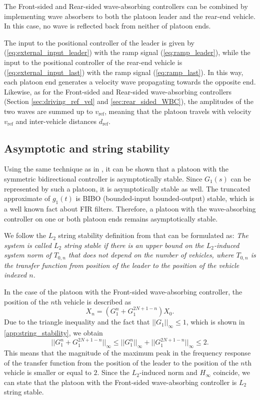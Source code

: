 \documentclass[final,5p,times,twocolumn]{elsarticle}
\begin{document}
The Front-sided and Rear-sided wave-absorbing controllers can be combined by implementing wave absorbers to both the platoon leader and the rear-end vehicle. In this case, no wave is reflected back from neither of platoon ends.

The input to the positional controller of the leader is given by (\ref{eq:external_input_leader}) with the ramp signal (\ref{eq:ramp_leader}), while the input to the positional controller of the rear-end vehicle is (\ref{eq:external_input_last}) with the ramp signal (\ref{eq:ramp_last}). In this way, each platoon end generates a velocity wave propagating towards the opposite end. Likewise, as for the Front-sided and Rear-sided wave-absorbing controllers (Section \ref{sec:driving_ref_vel} and \ref{sec:rear_sided_WBC}), the amplitudes of the two waves are summed up to $v_{\text{ref}}$, meaning that the platoon travels with velocity $v_{\text{ref}}$ and inter-vehicle distances $d_{\text{ref}}$.


\subsection{Asymptotic and string stability}
Using the same technique as in \cite{Herman2013}, it can be shown that a platoon with the symmetric bidirectional controller is asymptotically stable. Since $G_1(s)$ can be represented by such a platoon, it is asymptotically stable as well. The truncated approximate of $g_1(t)$ is BIBO (bounded-input bounded-output) stable, which is a well known fact about FIR filters. Therefore, a platoon with the wave-absorbing controller on one or both platoon ends remains asymptotically stable.

We follow the $L_2$ string stability definition from \cite{Eyre1998a} that can be formulated as:\emph{ The system is called $L_2$ string stable if there is an upper bound on the $L_2$-induced system norm of $T_{0,n}$ that does not depend on the number of vehicles, where $T_{0,n}$ is the transfer function from position of the leader to the position of the vehicle indexed $n$.}

In the case of the platoon with the Front-sided wave-absorbing controller, the position of the $n$th vehicle is described as
\begin{equation}
  X_{n} = (G_1^{n}+G_1^{2N+1-n}) X_{0}.
\end{equation}
Due to the triangle inequality and the fact that $||G_1||_{\infty} \leq 1$, which is shown in \ref{app:string_stability}, we obtain
\begin{equation}
  ||G_1^{n}+G_1^{2N+1-n}||_{\infty} \leq ||G_1^{n}||_{\infty}+||G_1^{2N+1-n}||_{\infty} \leq 2.
\end{equation}
This means that the magnitude of the maximum peak in the frequency response of the transfer function from the position of the leader to the position of the $n$th vehicle is smaller or equal to $2$. Since the $L_2$-induced norm and $H_{\infty}$ coincide, we can state that the platoon with the Front-sided wave-absorbing controller is $L_2$ string stable.
\end{document}
